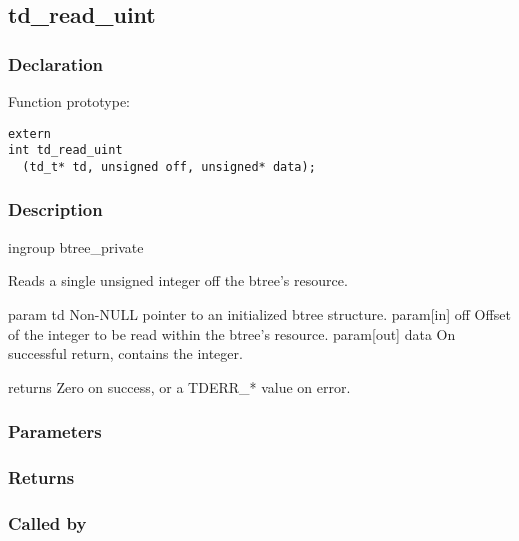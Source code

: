 
\newpage
\subsection{td\_read\_uint}
\subsubsection{Declaration} Function prototype:

\begin{verbatim}
extern
int td_read_uint
  (td_t* td, unsigned off, unsigned* data);
\end{verbatim}

\subsubsection{Description}


 ingroup btree\_private

 Reads a single unsigned integer off the btree's resource.

 param td Non-NULL pointer to an initialized btree structure.
 param[in] off Offset of the integer to be read within the btree's resource.
 param[out] data On successful return, contains the integer.

 returns Zero on success, or a TDERR\_* value on error.
 

\subsubsection{Parameters}
\subsubsection{Returns}
\subsubsection{Called by}
